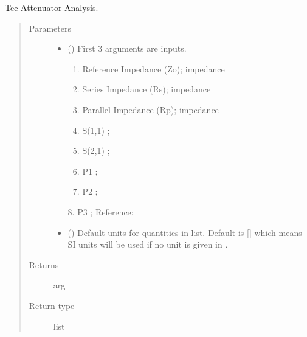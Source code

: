 \documentclass[letterpaper,10pt,english]{sphinxmanual}
\begin{document}

\begin{fulllineitems}
\label{\detokenize{components:components.Tee_Attenuator_Analysis}}
Tee Attenuator Analysis.
\begin{quote}\begin{description}
\item[{Parameters}] \leavevmode\begin{itemize}
\item {} 
 () \textendash{} 
First 3 arguments are inputs.
\begin{enumerate}
%
\item {} 
Reference Impedance (Zo); impedance

\item {} 
Series Impedance (Rs); impedance

\item {} 
Parallel Impedance (Rp); impedance

\item {} 
S(1,1) ;

\item {} 
S(2,1) ;

\item {} 
P1 ;

\item {} 
P2 ;

\end{enumerate}

8. P3 ;
Reference:


\item {} 
 (\sphinxstyleliteralemphasis{\sphinxupquote{, }}) \textendash{} Default units for quantities in  list. Default is {[}{]} which means SI units will be used if no unit is given in .

\end{itemize}

\item[{Returns}] \leavevmode
arg

\item[{Return type}] \leavevmode
list

\end{description}\end{quote}

\end{fulllineitems}
\end{document}
